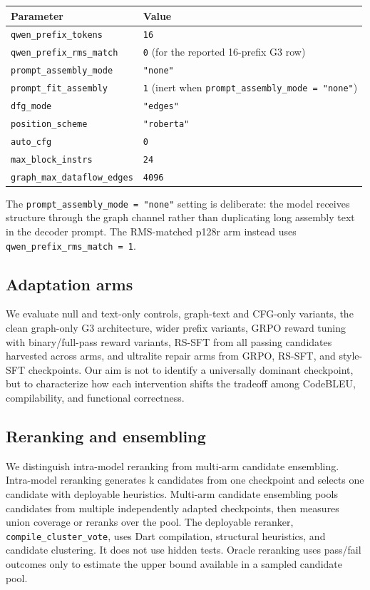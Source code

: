 \documentclass[11pt]{article}
\begin{document}
\begin{table}[h]
\centering
\small
\begin{tabular}{@{}ll@{}}
\toprule
Parameter & Value \\
\midrule
\texttt{qwen\_prefix\_tokens} & \texttt{16} \\
\texttt{qwen\_prefix\_rms\_match} & \texttt{0} (for the reported 16-prefix G3 row) \\
\texttt{prompt\_assembly\_mode} & \texttt{"none"} \\
\texttt{prompt\_fit\_assembly} & \texttt{1} (inert when \texttt{prompt\_assembly\_mode = "none"}) \\
\texttt{dfg\_mode} & \texttt{"edges"} \\
\texttt{position\_scheme} & \texttt{"roberta"} \\
\texttt{auto\_cfg} & \texttt{0} \\
\texttt{max\_block\_instrs} & \texttt{24} \\
\texttt{graph\_max\_dataflow\_edges} & \texttt{4096} \\
\bottomrule
\end{tabular}
\end{table}

The \texttt{prompt\_assembly\_mode = "none"} setting is deliberate: the model receives structure through the graph channel rather than duplicating long assembly text in the decoder prompt. The RMS-matched p128r arm instead uses \texttt{qwen\_prefix\_rms\_match = 1}.

\subsection{Adaptation arms}

We evaluate null and text-only controls, graph-text and CFG-only variants, the clean graph-only G3 architecture, wider prefix variants, GRPO reward tuning with binary/full-pass reward variants, RS-SFT from all passing candidates harvested across arms, and ultralite repair arms from GRPO, RS-SFT, and style-SFT checkpoints. Our aim is not to identify a universally dominant checkpoint, but to characterize how each intervention shifts the tradeoff among CodeBLEU, compilability, and functional correctness.

\subsection{Reranking and ensembling}

We distinguish intra-model reranking from multi-arm candidate ensembling. Intra-model reranking generates k candidates from one checkpoint and selects one candidate with deployable heuristics. Multi-arm candidate ensembling pools candidates from multiple independently adapted checkpoints, then measures union coverage or reranks over the pool. The deployable reranker, \texttt{compile\_cluster\_vote}, uses Dart compilation, structural heuristics, and candidate clustering. It does not use hidden tests. Oracle reranking uses pass/fail outcomes only to estimate the upper bound available in a sampled candidate pool.
\end{document}
